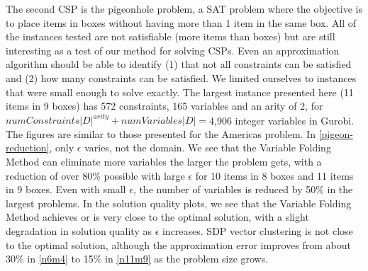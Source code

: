 \documentclass[12pt]{article} %
\begin{document}
\FloatBarrier
The second CSP is the pigeonhole problem, a SAT problem where the objective is to place items in boxes without having more than 1 item in the same box. All of the instances tested are not satisfiable (more items than boxes) but are still interesting as a test of our method for solving CSPs. Even an approximation algorithm should be able to identify (1) that not all constraints can be satisfied and (2) how many constraints can be satisfied. We limited ourselves to instances that were small enough to solve exactly. The largest instance presented here (11 items in 9 boxes) has 572 constraints, 165 variables and an arity of 2, for $numConstraints |D|^{arity} + numVariables |D|=$4,906 integer variables in Gurobi. The figures are similar to those presented for the Americas problem. In \autoref{pigeon-reduction}, only $\epsilon$ varies, not the domain. We see that the Variable Folding Method can eliminate more variables the larger the problem gets, with a reduction of over 80\% possible with large $\epsilon$ for 10 items in 8 boxes and 11 items in 9 boxes. Even with small $\epsilon$, the number of variables is reduced by 50\% in the largest problems. In the solution quality plots, we see that the Variable Folding Method achieves or is very close to the optimal solution, with a slight degradation in solution quality as $\epsilon$ increases. SDP vector clustering is not close to the optimal solution, although the approximation error improves from about 30\% in \ref{n6m4} to 15\% in \ref{n11m9} as the problem size grows.
\end{document}
